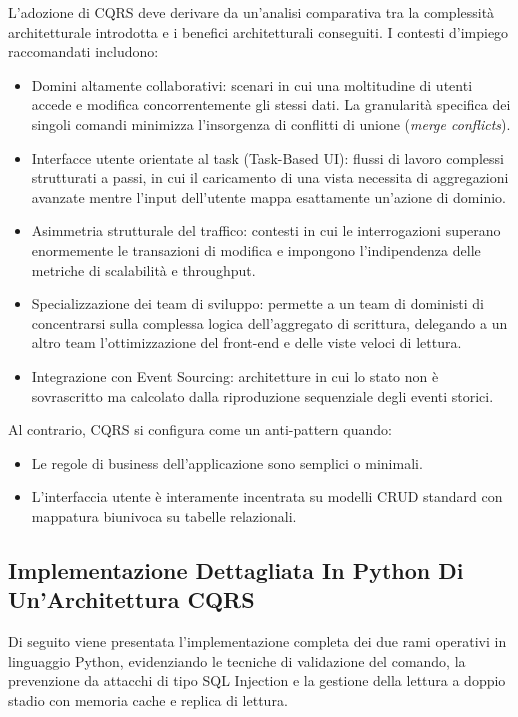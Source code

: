 \documentclass[11pt, a4paper]{article}
\begin{document}
L'adozione di CQRS deve derivare da un'analisi comparativa tra la complessità architetturale introdotta e i benefici architetturali conseguiti. I contesti d'impiego raccomandati includono:
\begin{itemize}[noitemsep]
    \item Domini altamente collaborativi: scenari in cui una moltitudine di utenti accede e modifica concorrentemente gli stessi dati. La granularità specifica dei singoli comandi minimizza l'insorgenza di conflitti di unione (\emph{merge conflicts}).
    \item Interfacce utente orientate al task (Task-Based UI): flussi di lavoro complessi strutturati a passi, in cui il caricamento di una vista necessita di aggregazioni avanzate mentre l'input dell'utente mappa esattamente un'azione di dominio.
    \item Asimmetria strutturale del traffico: contesti in cui le interrogazioni superano enormemente le transazioni di modifica e impongono l'indipendenza delle metriche di scalabilità e throughput.
    \item Specializzazione dei team di sviluppo: permette a un team di doministi di concentrarsi sulla complessa logica dell'aggregato di scrittura, delegando a un altro team l'ottimizzazione del front-end e delle viste veloci di lettura.
    \item Integrazione con Event Sourcing: architetture in cui lo stato non è sovrascritto ma calcolato dalla riproduzione sequenziale degli eventi storici.
\end{itemize}

Al contrario, CQRS si configura come un anti-pattern quando:
\begin{itemize}[noitemsep]
    \item Le regole di business dell'applicazione sono semplici o minimali.
    \item L'interfaccia utente è interamente incentrata su modelli CRUD standard con mappatura biunivoca su tabelle relazionali.
\end{itemize}

\subsection{Implementazione Dettagliata In Python Di Un'Architettura CQRS}

Di seguito viene presentata l'implementazione completa dei due rami operativi in linguaggio Python, evidenziando le tecniche di validazione del comando, la prevenzione da attacchi di tipo SQL Injection e la gestione della lettura a doppio stadio con memoria cache e replica di lettura.
\end{document}
